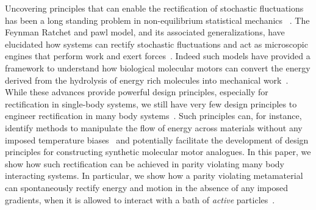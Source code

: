 \documentclass[
 preprint,
 preprintnumbers,
 amsmath,amssymb,
 aps,
 pre,
 longbibliography,
 superscriptaddress,
 10pt, twocolumn
]{revtex4-1}
\begin{document}

Uncovering principles that can enable the rectification of stochastic fluctuations has been a long standing problem in non-equilibrium statistical mechanics ~\cite{Seifert2012StochasticThermodynamics,Coskun2011GreatExpectations}. The Feynman Ratchet and pawl model, and its associated generalizations, have elucidated how systems can rectify stochastic fluctuations and act as microscopic engines that perform work and exert forces~\cite{Jarzynski1999FeynmanRatchet}. Indeed such models have provided a framework to understand how biological molecular motors can convert the energy derived from the hydrolysis of energy rich molecules into mechanical work~\cite{Mogilner1996CellMotility,Chernyak2008PumpingRestriction,Rahav2008DirectedFlow,Sinitsyn2007UniversalGeometric}. While these advances provide powerful design principles, especially for rectification in single-body systems, we still have very few design principles to engineer rectification in many body systems~\cite{Seifert2012StochasticThermodynamics,Pietzonka2019AutonomousEngines}. Such principles can, for instance, identify methods to manipulate the flow of energy across materials without any imposed temperature biases~\cite{Zhu2016PersistentDirectional,Zhu2018TheoryManybody,Dubi2011ColloquiumHeat,Kanazawa2013HeatConduction,Martinez2017ColloidalHeat} and potentially facilitate the development of design principles for constructing synthetic molecular motor analogues. In this paper, we show how such rectification can be achieved in parity violating many body interacting systems. In particular, we show how a parity violating metamaterial~\cite{Nash2015TopologicalMechanics} can spontaneously rectify energy and motion in the absence of any imposed gradients, when it is allowed to interact with a bath of \textit{active} particles~\cite{Marchetti2013HydrodynamicsSoft,Koumakis2013TargetedDelivery,Woodhouse2018AutonomousActuation}. 


\end{document}
